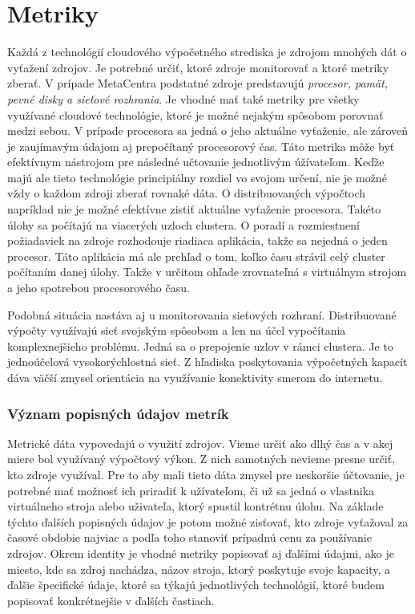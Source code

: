 \documentclass[11pt,final,oneside]{fithesis}
\begin{document}
\chapter{Metriky}
Každá z technológií cloudového výpočetného strediska je zdrojom mnohých dát o vyťažení zdrojov. Je potrebné určiť, ktoré zdroje monitorovať a ktoré metriky zberať. V prípade MetaCentra podstatné
zdroje predstavujú \emph{procesor, pamät, pevné disky a sieťové rozhrania}. Je vhodné mať také metriky pre všetky využívané cloudové technológie,
ktoré je možné nejakým spôsobom porovnať medzi sebou. V prípade procesora sa jedná o jeho aktuálne vyťaženie, ale zároveň je zaujímavým údajom aj prepočítaný procesorový čas. Táto metrika môže byť efektívnym
nástrojom pre následné učtovanie jednotlivým úžívateľom. Keďže majú ale tieto technológie principiálny rozdiel vo svojom určení, nie je možné vždy o každom zdroji zberať rovnaké dáta. 
O distribuovaných výpočtoch napríklad nie je možné efektívne zistiť aktuálne vyťaženie procesora. Takéto úlohy sa počítajú na viacerých uzloch clustera. O poradí a rozmiestnení požiadaviek na zdroje
rozhodouje riadiaca aplikácia, takže sa nejedná o jeden procesor. Táto aplikácia má ale prehľad o tom, koľko času strávil celý cluster počítaním danej úlohy. Takže v určitom ohľade zrovnateľná s virtuálnym
strojom a jeho spotrebou procesorového času.

Podobná situácia nastáva aj u monitorovania sieťových rozhraní. Distribuované výpočty využívajú sieť svojským spôsobom a len na účel vypočítania komplexnejšieho problému. Jedná sa o prepojenie
uzlov v rámci clustera. Je to jednoúčelová vysokorýchlostná sieť. Z hľadiska poskytovania výpočetných kapacít dáva väčší zmysel orientácia na využívanie konektivity smerom do internetu. 

\subsection{Význam popisných údajov metrík}
Metrické dáta vypovedajú o využití zdrojov. Vieme určiť ako dlhý čas a v akej miere bol využívaný výpočtový výkon. Z nich samotných nevieme presne určiť, kto zdroje využíval. Pre to aby mali tieto dáta zmysel 
pre neskoršie účtovanie, je potrebné mať možnosť ich priradiť k užívateľom, či už sa jedná o vlastnika virtuálneho stroja alebo uživateľa, ktorý spustil kontrétnu úlohu. Na základe týchto ďalších popisných  údajov je potom 
možné zisťovať, kto zdroje vyťažoval za časové obdobie najviac a podľa toho stanoviť prípadnú cenu za používanie zdrojov. Okrem identity je vhodné metriky popisovať aj ďalšími údajmi, ako je miesto, kde
sa zdroj nachádza, názov stroja, ktorý poskytuje svoje kapacity, a ďalšie špecifické údaje, ktoré sa týkajú jednotlivých technológií, ktoré budem popisovať konkrétnejšie v ďalších častiach.
\end{document}

